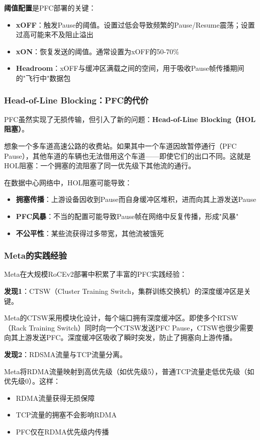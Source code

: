 \textbf{阈值配置}是PFC部署的关键：
\begin{itemize}
    \item \textbf{xOFF}：触发Pause的阈值。设置过低会导致频繁的Pause/Resume震荡；设置过高可能来不及阻止溢出
    \item \textbf{xON}：恢复发送的阈值。通常设置为xOFF的50-70\%
    \item \textbf{Headroom}：xOFF与缓冲区满载之间的空间，用于吸收Pause帧传播期间的"飞行中"数据包
\end{itemize}

\subsubsection{Head-of-Line Blocking：PFC的代价}

PFC虽然实现了无损传输，但引入了新的问题：\textbf{Head-of-Line Blocking（HOL阻塞）}。

想象一个多车道高速公路的收费站。如果其中一个车道因故暂停通行（PFC Pause），其他车道的车辆也无法借用这个车道——即使它们的出口不同。这就是HOL阻塞：一个拥塞的流阻塞了同一优先级下其他流的通行。

在数据中心网络中，HOL阻塞可能导致：
\begin{itemize}
    \item \textbf{拥塞传播}：上游设备因收到Pause而自身缓冲区堆积，进而向其上游发送Pause
    \item \textbf{PFC风暴}：不当的配置可能导致Pause帧在网络中反复传播，形成"风暴"
    \item \textbf{不公平性}：某些流获得过多带宽，其他流被饿死
\end{itemize}

\subsubsection{Meta的实践经验}

Meta在大规模RoCEv2部署中积累了丰富的PFC实践经验：

\textbf{发现1}：CTSW（Cluster Training Switch，集群训练交换机）的深度缓冲区是关键。

Meta的CTSW采用模块化设计，每个端口拥有深度缓冲区。即使多个RTSW（Rack Training Switch）同时向一个CTSW发送PFC Pause，CTSW也很少需要向其上游发送PFC。深度缓冲区吸收了瞬时突发，防止了拥塞向上游传播。

\textbf{发现2}：RDSMA流量与TCP流量分离。

Meta将RDMA流量映射到高优先级（如优先级5），普通TCP流量走低优先级（如优先级0）。这样：
\begin{itemize}
    \item RDMA流量获得无损保障
    \item TCP流量的拥塞不会影响RDMA
    \item PFC仅在RDMA优先级内传播
\end{itemize}

